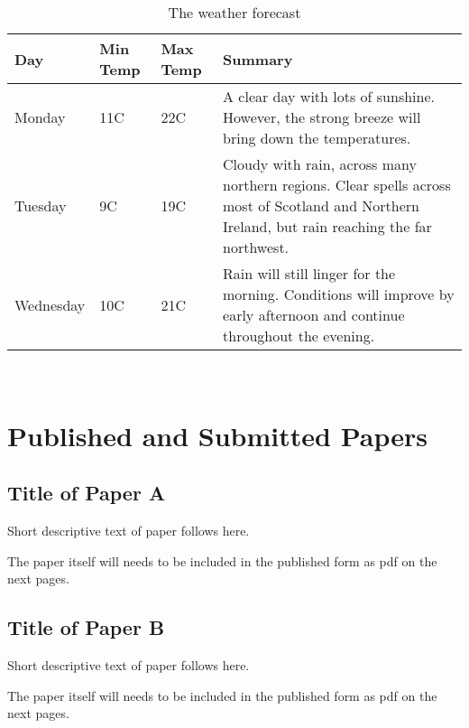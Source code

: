 \documentclass[11pt,openright]{book} %
\begin{document}
\begin{table}[!ht]
 \caption{The weather forecast}
  \centering
   \begin{tabular}{ | l | l | l | p{5cm} |}
    \hline
    Day & Min Temp & Max Temp & Summary \\ \hline
    Monday & 11C & 22C & A clear day with lots of sunshine.
    However, the strong breeze will bring down the temperatures. \\ \hline
    Tuesday & 9C & 19C & Cloudy with rain, across many northern regions. Clear spells
    across most of Scotland and Northern Ireland,
    but rain reaching the far northwest. \\ \hline
    Wednesday & 10C & 21C & Rain will still linger for the morning.
    Conditions will improve by early afternoon and continue
    throughout the evening. \\
    \hline
    \end{tabular}
\end{table}

~\nocite{*}

\cleardoublepage
{}



\appendix
\renewcommand{\appendixname}{Paper} %

\part{Published and Submitted Papers}  %
\label{part:papers}


\chapter{Title of Paper A}
\label{paper-a}

Short descriptive text of paper follows here.

The paper itself will needs to be included in the published form as pdf on the next pages.

\chapter{Title of Paper B}
\label{paper-b}
Short descriptive text of paper follows here.

The paper itself will needs to be included in the published form as pdf on the next pages.
\end{document}
